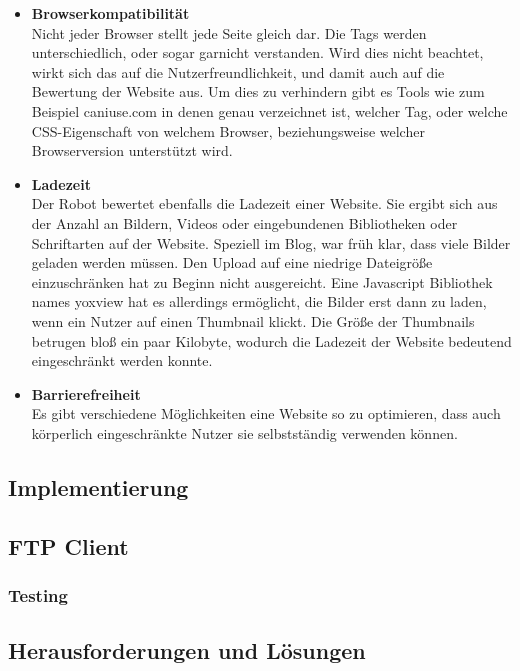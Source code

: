 {\begin{itemize}
      \item \textbf{Browserkompatibilität}\\
        Nicht jeder Browser stellt jede Seite gleich dar. Die Tags werden unterschiedlich, oder sogar garnicht verstanden. Wird dies nicht beachtet, wirkt sich das auf die Nutzerfreundlichkeit,
        und damit auch auf die Bewertung der Website aus. Um dies zu verhindern gibt es Tools wie zum Beispiel caniuse.com in denen genau verzeichnet ist, welcher Tag, oder welche CSS-Eigenschaft
        von welchem Browser, beziehungsweise welcher Browserversion unterstützt wird.

      \item \textbf{Ladezeit}\\
        Der Robot bewertet ebenfalls die Ladezeit einer Website. Sie ergibt sich aus der Anzahl an Bildern, Videos oder eingebundenen Bibliotheken oder Schriftarten auf der Website.
        Speziell im Blog, war früh klar, dass viele Bilder geladen werden müssen. Den Upload auf eine niedrige Dateigröße einzuschränken hat zu Beginn nicht ausgereicht.
        Eine Javascript Bibliothek names yoxview hat es allerdings ermöglicht, die Bilder erst dann zu laden, wenn ein Nutzer auf einen Thumbnail klickt. Die Größe der Thumbnails betrugen bloß
        ein paar Kilobyte, wodurch die Ladezeit der Website bedeutend eingeschränkt werden konnte.

      \item \textbf{Barrierefreiheit}\\
        Es gibt verschiedene Möglichkeiten eine Website so zu optimieren, dass auch körperlich eingeschränkte Nutzer sie selbstständig verwenden können.
    \end{itemize}

  \subsection{Implementierung}

    \subsection{FTP Client}

    \subsubsection{Testing}

  \subsection{Herausforderungen und Lösungen}

}
